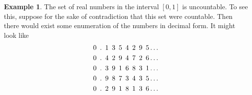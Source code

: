 \documentclass[11pt,letterpaper]{article}
\numberwithin{theorem}{section}
\numberwithin{definition}{section}
\numberwithin{lemma}{section}
\numberwithin{corollary}{section}
\numberwithin{proposition}{section}
\theoremstyle{definition}
\numberwithin{remark}{section}
\numberwithin{claim}{section}
\numberwithin{observation}{section}
\numberwithin{fact}{section}
\numberwithin{assumption}{section}
\newtheorem{example}[theorem]{Example}
\numberwithin{example}{section}
\numberwithin{exercise}{section}
\begin{document}
\begin{example}
The set of real numbers in the interval $[0,1]$ is uncountable. To see this, suppose for the sake of contradiction that this set were countable. Then there would exist some enumeration of the numbers in decimal form. It might look like
\begin{align*}
&0 \hspace{.5em}.\hspace{.5em}1\hspace{.5em} 3\hspace{.5em} 5\hspace{.5em} 4 \hspace{.5em}2\hspace{.5em} 9\hspace{.5em} 5 \dots \\
&0 \hspace{.5em}.\hspace{.5em}4\hspace{.5em} 2\hspace{.5em} 9\hspace{.5em} 4 \hspace{.5em}7\hspace{.5em} 2\hspace{.5em} 6 \dots \\
&0 \hspace{.5em}.\hspace{.5em}3\hspace{.5em} 9\hspace{.5em} 1\hspace{.5em} 6 \hspace{.5em}8\hspace{.5em} 3\hspace{.5em} 1 \dots \\
&0 \hspace{.5em}.\hspace{.5em}9\hspace{.5em} 8\hspace{.5em} 7\hspace{.5em} 3 \hspace{.5em}4\hspace{.5em} 3\hspace{.5em} 5 \dots \\
&0 \hspace{.5em}.\hspace{.5em}2\hspace{.5em} 9\hspace{.5em} 1\hspace{.5em} 8 \hspace{.5em}1\hspace{.5em} 3\hspace{.5em} 6 \dots \\

\end{align*}
\end{example}
\end{document}
